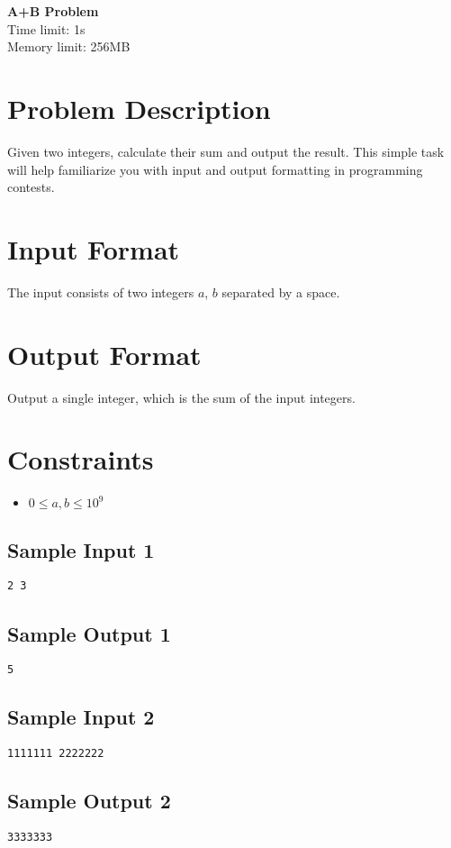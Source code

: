 \documentclass[12pt, a4paper]{article}
\begin{document}
\begin{center}
    \parbox{0.8\textwidth}{
        \centering
        \vspace{0.5em}
        \LARGE \textbf{A+B Problem}\\[0.5em]
        \large{Time limit: 1s}\\
        \large{Memory limit: 256MB}\\[0.8em]
    }
\end{center}
\thispagestyle{fancy}

\section*{Problem Description}
Given two integers, calculate their sum and output the result. This simple task will help familiarize you with input and output formatting in programming contests.

\section*{Input Format}
The input consists of two integers $a$, $b$ separated by a space.

\section*{Output Format}
Output a single integer, which is the sum of the input integers.

\section*{Constraints}
\begin{itemize}
    \item $0 \le a, b \le 10^9$
\end{itemize}

\begin{paracol}{2}
    \subsection*{Sample Input 1}
    \begin{lstlisting}
2 3
    \end{lstlisting}
    \switchcolumn
    \subsection*{Sample Output 1}
    \begin{lstlisting}
5
    \end{lstlisting}
\end{paracol}

\begin{paracol}{2}
    \subsection*{Sample Input 2}
    \begin{lstlisting}
1111111 2222222
    \end{lstlisting}
    \switchcolumn
    \subsection*{Sample Output 2}
    \begin{lstlisting}
3333333
    \end{lstlisting}
\end{paracol}
\end{document}
